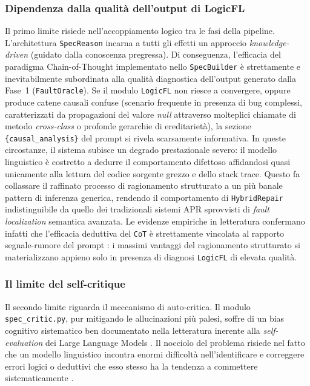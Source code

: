 \subsubsection{Dipendenza dalla qualità dell'output di LogicFL}
Il primo limite risiede nell'accoppiamento logico tra le fasi della pipeline. L'architettura
\texttt{SpecReason} incarna a tutti gli effetti un approccio \textit{knowledge-driven} (guidato
dalla conoscenza pregressa). Di conseguenza, l'efficacia del paradigma Chain-of-Thought
implementato nello \texttt{SpecBuilder} è strettamente e inevitabilmente subordinata alla
qualità diagnostica dell'output generato dalla Fase~1 (\texttt{FaultOracle}).
Se il modulo \texttt{LogicFL} non riesce a convergere, oppure produce catene causali confuse
(scenario frequente in presenza di bug complessi, caratterizzati da propagazioni del valore
\textit{null} attraverso molteplici chiamate di metodo \textit{cross-class} o profonde
gerarchie di ereditarietà), la sezione \texttt{\{causal\_analysis\}} del prompt si rivela
scarsamente informativa. In queste circostanze, il sistema subisce un degrado prestazionale
severo: il modello linguistico è costretto a dedurre il comportamento difettoso affidandosi
quasi unicamente alla lettura del codice sorgente grezzo e dello stack trace. Questo fa
collassare il raffinato processo di ragionamento strutturato a un più banale pattern di
inferenza generica, rendendo il comportamento di \texttt{HybridRepair} indistinguibile da
quello dei tradizionali sistemi APR sprovvisti di \textit{fault localization} semantica
avanzata. Le evidenze empiriche in letteratura confermano infatti che l'efficacia deduttiva
del \texttt{CoT} è strettamente vincolata al rapporto segnale-rumore del prompt
\cite{exploring_apr_2026}: i massimi vantaggi del ragionamento strutturato si materializzano
appieno solo in presenza di diagnosi \texttt{LogicFL} di elevata qualità.

\subsubsection{Il limite del self-critique}
\label{subsubsec:limite-selfcritique}
Il secondo limite riguarda il meccanismo di auto-critica. Il modulo \texttt{spec\_critic.py},
pur mitigando le allucinazioni più palesi, soffre di un bias cognitivo sistematico ben
documentato nella letteratura inerente alla \textit{self-evaluation} dei Large Language Models
\cite{zheng2023judging}. Il nocciolo del problema risiede nel fatto che un modello linguistico
incontra enormi difficoltà nell'identificare e correggere errori logici o deduttivi che esso
stesso ha la tendenza a commettere sistematicamente \cite{huang2024large}.

